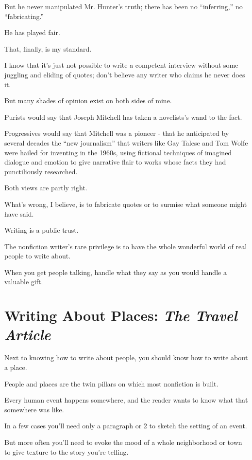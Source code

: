 \documentclass{book}
\numberwithin{equation}{section}
\begin{document}
But he never manipulated Mr. Hunter's truth; there has been no ``inferring,'' no ``fabricating.''

He has played fair.

%
That, finally, is my standard.

I know that it's just not possible to write a competent interview without some juggling and eliding of quotes; don't believe any writer who claims he never does it.

But many shades of opinion exist on both sides of mine.

Purists would say that Joseph Mitchell has taken a novelists's wand to the fact.

Progressives would say that Mitchell was a pioneer - that he anticipated by several decades the ``new journalism'' that writers like Gay Talese and Tom Wolfe were hailed for inventing in the 1960s, using fictional techniques of imagined dialogue and emotion to give narrative flair to works whose facts they had punctiliously researched.

Both views are partly right.

%
What's wrong, I believe, is to fabricate quotes or to surmise what someone might have said.

Writing is a public trust.

The nonfiction writer's rare privilege is to have the whole wonderful world of real people to write about.

When you get people talking, handle what they say as you would handle a valuable gift.


\chapter{Writing About Places: \textit{The Travel Article}}

Next to knowing how to write about people, you should know how to write about a place.

People and places are the twin pillars on which most nonfiction is built.

Every human event happens somewhere, and the reader wants to know what that somewhere was like.

%
In a few cases you'll need only a paragraph or 2 to sketch the setting of an event.

But more often you'll need to evoke the mood of a whole neighborhood or town to give texture to the story you're telling.
\end{document}
